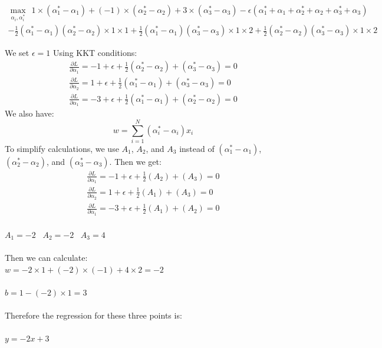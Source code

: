 \documentclass[fleqn,10pt]{olplainarticle}
\begin{document}
\[
\begin{aligned}
\max_{\alpha_i, \alpha_i^*} \ \
1 \times (\alpha_1^* - \alpha_1) + (-1)\times(\alpha_2^* - \alpha_2) + 3\times(\alpha_3^* - \alpha_3) - \epsilon(\alpha_1^* + \alpha_1 + \alpha_2^* + \alpha_2 + \alpha_3^* + \alpha_3) \\
- \frac{1}{2}(\alpha_1^* - \alpha_1)(\alpha_2^* - \alpha_2)\times1\times 1 + \frac{1}{2}(\alpha_1^* - \alpha_1)(\alpha_3^* - \alpha_3)\times1\times 2 + \frac{1}{2}(\alpha_2^* - \alpha_2)(\alpha_3^* - \alpha_3)\times1\times 2
\end{aligned}
\]

We set $\epsilon = 1$
Using KKT conditions:
\[
\begin{aligned}
\frac{\partial L}{\partial \alpha_1} = -1+\epsilon+\frac{1}{2}(\alpha_2^* - \alpha_2) + (\alpha_3^* - \alpha_3) = 0 \\
\frac{\partial L}{\partial \alpha_2} = 1+\epsilon+\frac{1}{2}(\alpha_1^* - \alpha_1) + (\alpha_3^* - \alpha_3) = 0 \\
\frac{\partial L}{\partial \alpha_1} = -3+\epsilon+\frac{1}{2}(\alpha_1^* - \alpha_1) + (\alpha_2^* - \alpha_2) = 0
\end{aligned}
\]
We also have:
\[
w = \sum_{i=1}^N(\alpha_i^* - \alpha_i)x_i
\]
To simplify calculations, we use $A_1$, $A_2$, and $A_3$ instead of $(\alpha_1^* - \alpha_1)$, $(\alpha_2^* - \alpha_2)$, and $(\alpha_3^* - \alpha_3)$. Then we get:
\[
\begin{aligned}
\frac{\partial L}{\partial \alpha_1} = -1+\epsilon+\frac{1}{2}(A_2) + (A_3) = 0 \\
\frac{\partial L}{\partial \alpha_2} = 1+\epsilon+\frac{1}{2}(A_1) + (A_3) = 0 \\
\frac{\partial L}{\partial \alpha_1} = -3+\epsilon+\frac{1}{2}(A_1) + (A_2) = 0 \\
\end{aligned}
\]

\(A_1 = -2\) \ \(A_2 = -2\) \ \(A_3 = 4\) \\\\
Then we can calculate:\\
$w = -2\times1 +(-2)\times(-1) +4\times2 = -2$ \\\\
$b = 1 - (-2)\times1=3$ \\\\
Therefore the regression for these three points is: \\\\
$y = -2x+3$
\end{document}
